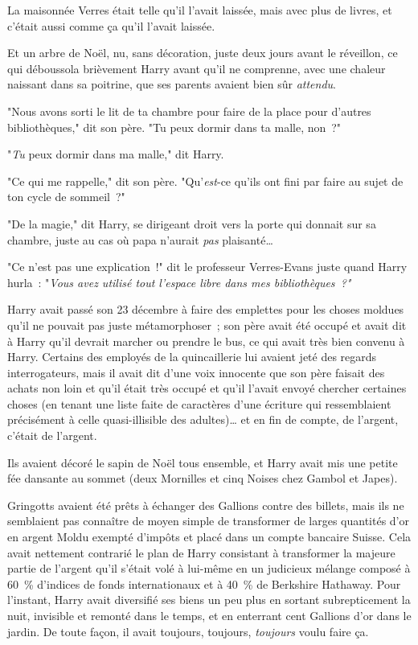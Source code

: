 La maisonnée Verres était telle qu'il l'avait laissée, mais avec plus de livres, et c'était aussi comme ça qu'il l'avait laissée.

Et un arbre de Noël, nu, sans décoration, juste deux jours avant le réveillon, ce qui déboussola brièvement Harry avant qu'il ne comprenne, avec une chaleur naissant dans sa poitrine, que ses parents avaient bien sûr \emph{attendu}.

"Nous avons sorti le lit de ta chambre pour faire de la place pour d'autres bibliothèques," dit son père. "Tu peux dormir dans ta malle, non~?"

"\emph{Tu} peux dormir dans ma malle," dit Harry.

"Ce qui me rappelle," dit son père. "Qu'\emph{est}-ce qu'ils ont fini par faire au sujet de ton cycle de sommeil~?"

"De la magie," dit Harry, se dirigeant droit vers la porte qui donnait sur sa chambre, juste au cas où papa n'aurait \emph{pas} plaisanté…

"Ce n'est pas une explication~!" dit le professeur Verres-Evans juste quand Harry hurla~: "\emph{Vous avez utilisé tout l'espace libre dans mes bibliothèques~?"}

\later

Harry avait passé son 23 décembre à faire des emplettes pour les choses moldues qu'il ne pouvait pas juste métamorphoser~; son père avait été occupé et avait dit à Harry qu'il devrait marcher ou prendre le bus, ce qui avait très bien convenu à Harry. Certains des employés de la quincaillerie lui avaient jeté des regards interrogateurs, mais il avait dit d'une voix innocente que son père faisait des achats non loin et qu'il était très occupé et qu'il l'avait envoyé chercher certaines choses (en tenant une liste faite de caractères d'une écriture qui ressemblaient précisément à celle quasi-illisible des adultes)… et en fin de compte, de l'argent, c'était de l'argent.

Ils avaient décoré le sapin de Noël tous ensemble, et Harry avait mis une petite fée dansante au sommet (deux Mornilles et cinq Noises chez Gambol et Japes).

Gringotts avaient été prêts à échanger des Gallions contre des billets, mais ils ne semblaient pas connaître de moyen simple de transformer de larges quantités d'or en argent Moldu exempté d'impôts et placé dans un compte bancaire Suisse. Cela avait nettement contrarié le plan de Harry consistant à transformer la majeure partie de l'argent qu'il s'était volé à lui-même en un judicieux mélange composé à 60~\% d'indices de fonds internationaux et à 40~\% de Berkshire Hathaway. Pour l'instant, Harry avait diversifié ses biens un peu plus en sortant subrepticement la nuit, invisible et remonté dans le temps, et en enterrant cent Gallions d'or dans le jardin. De toute façon, il avait toujours, toujours, \emph{toujours} voulu faire ça.

